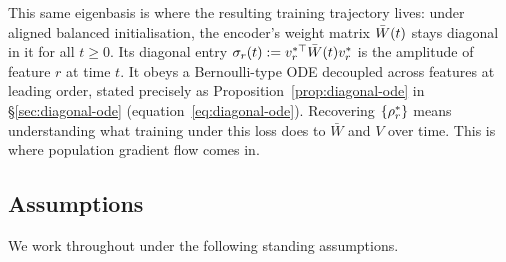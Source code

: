 This same eigenbasis is where the resulting training trajectory lives:
under aligned balanced initialisation, the encoder's weight matrix
$\bar{W}(t)$ stays diagonal in it for all $t \ge 0$. Its diagonal entry
$\sigma_r(t) := v_r^{*\top}\bar{W}(t)v_r^*$ is the amplitude of feature
$r$ at time $t$. It obeys a Bernoulli-type ODE decoupled across
features at leading order, stated precisely as
Proposition~\ref{prop:diagonal-ode} in \S\ref{sec:diagonal-ode}
(equation~\eqref{eq:diagonal-ode}). Recovering $\{\rho_r^*\}$ means
understanding what training under this loss does to $\bar W$ and $V$
over time. This is where population gradient flow comes in.

\subsection*{Assumptions}
\label{ssec:assumptions-intro}

We work throughout under the following standing assumptions.


